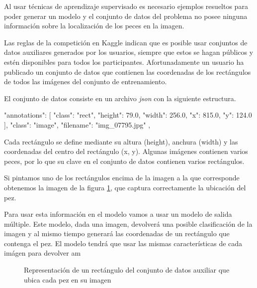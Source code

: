 Al usar técnicas de aprendizaje supervisado es necesario ejemplos resueltos para poder generar un modelo y el conjunto de datos del problema no posee ninguna información sobre la localización de los peces en la imagen.

Las reglas de la competición en Kaggle indican que es posible usar conjuntos de datos auxiliares generados por los usuarios, siempre que estos se hagan públicos y estén disponibles para todos los participantes. Afortunadamente un usuario ha publicado un conjunto de datos que contienen las coordenadas de los rectángulos de todos las imágenes del conjunto de entrenamiento.

El conjunto de datos consiste en un archivo \textit{json} con la siguiente estructura.

\begin{python}
{
    "annotations": [
        {
            "class": "rect",
            "height": 79.0,
            "width": 256.0,
            "x": 815.0,
            "y": 124.0
        }
    ],
    "class": "image",
    "filename": "img_07795.jpg"
},
\end{python}

Cada rectángulo se define mediante su altura (height), anchura (width) y las coordenadas del centro del rectángulo (x, y). Algunas imágenes contienen varios peces, por lo que su clave en el conjunto de datos contienen varios rectángulos.

Si pintamos uno de los rectángulos encima de la imagen a la que corresponde obtenemos la imagen de la figura \ref{box}, que captura correctamente la ubicación del pez.

Para usar esta información en el modelo vamos a usar un modelo de salida múltiple. Este modelo, dada una imagen, devolverá una posible clasificación de la imagen y al mismo tiempo generará las coordenadas de un rectángulo que contenga el pez. El modelo tendrá que usar las mismas características de cada imágen para devolver am


\begin{figure}
  \caption{Representación de un rectángulo del conjunto de datos auxiliar que ubica cada pez en su imagen}
\label{box}
\end{figure}

